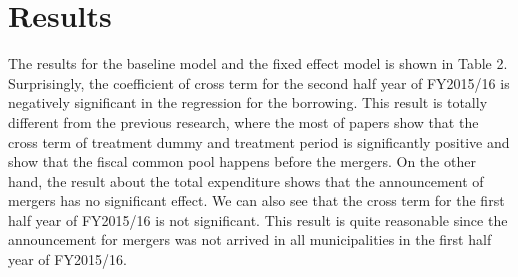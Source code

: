 \documentclass[dvipdfmx]{jsarticle}
\begin{document}
\section{Results}
\quad The results for the baseline model and the fixed effect model is shown in Table 2. Surprisingly, the coefficient of cross term for the second half year of FY2015/16 is negatively significant in the regression for the borrowing. This result is totally different from the previous research, where the most of papers show that the cross term of treatment dummy and treatment period is significantly positive and show that the fiscal common pool happens before the mergers. On the other hand, the result about the total expenditure shows that the announcement of mergers has no significant effect. We can also see that the cross term for the first half year of FY2015/16 is not significant. This result is quite reasonable since the announcement for mergers was not arrived in all municipalities in the first half year of FY2015/16. 
\end{document}
